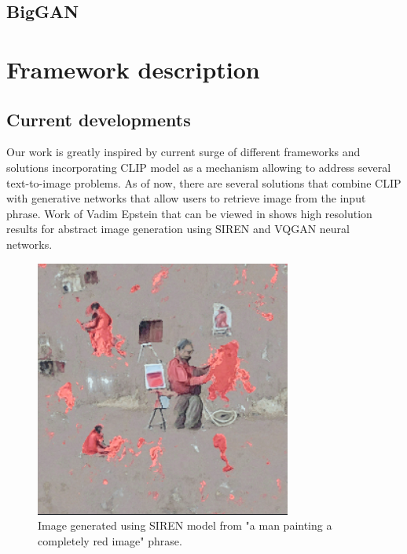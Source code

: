 \documentclass[12pt,a4paper,openany]{book}
\begin{document}



\section{BigGAN}

\chapter{Framework description}

\section{Current developments}

\noindent Our work is greatly inspired by current surge of different frameworks and solutions incorporating CLIP model as a mechanism allowing to address several text-to-image problems. As of now, there are several solutions that combine CLIP with generative networks that allow users to retrieve image from the input phrase. Work of Vadim Epstein that can be viewed in \cite{aphantasia} shows high resolution results for abstract image generation using SIREN \cite{siren} and VQGAN \cite{vqgan} neural networks.\

\begin{figure}[H]
    \centering
    \includegraphics[scale=1.0]{figs/deepdaze.png}
    \caption{Image generated using SIREN \cite{siren} model from "a man painting a completely red image" phrase.}\label{Fig:deepdaze}
\end{figure}
\end{document}
